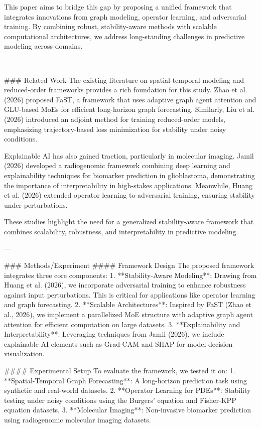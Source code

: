 This paper aims to bridge this gap by proposing a unified framework that integrates innovations from graph modeling, operator learning, and adversarial training. By combining robust, stability-aware methods with scalable computational architectures, we address long-standing challenges in predictive modeling across domains.

---

### Related Work
The existing literature on spatial-temporal modeling and reduced-order frameworks provides a rich foundation for this study. Zhao et al. (2026) proposed FaST, a framework that uses adaptive graph agent attention and GLU-based MoEs for efficient long-horizon graph forecasting. Similarly, Liu et al. (2026) introduced an adjoint method for training reduced-order models, emphasizing trajectory-based loss minimization for stability under noisy conditions.

Explainable AI has also gained traction, particularly in molecular imaging. Jamil (2026) developed a radiogenomic framework combining deep learning and explainability techniques for biomarker prediction in glioblastoma, demonstrating the importance of interpretability in high-stakes applications. Meanwhile, Huang et al. (2026) extended operator learning to adversarial training, ensuring stability under perturbations.

These studies highlight the need for a generalized stability-aware framework that combines scalability, robustness, and interpretability in predictive modeling.

---

### Methods/Experiment
#### Framework Design
The proposed framework integrates three core components:
1. **Stability-Aware Modeling**: Drawing from Huang et al. (2026), we incorporate adversarial training to enhance robustness against input perturbations. This is critical for applications like operator learning and graph forecasting.
2. **Scalable Architectures**: Inspired by FaST (Zhao et al., 2026), we implement a parallelized MoE structure with adaptive graph agent attention for efficient computation on large datasets.
3. **Explainability and Interpretability**: Leveraging techniques from Jamil (2026), we include explainable AI elements such as Grad-CAM and SHAP for model decision visualization.

#### Experimental Setup
To evaluate the framework, we tested it on:
1. **Spatial-Temporal Graph Forecasting**: A long-horizon prediction task using synthetic and real-world datasets.
2. **Operator Learning for PDEs**: Stability testing under noisy conditions using the Burgers' equation and Fisher-KPP equation datasets.
3. **Molecular Imaging**: Non-invasive biomarker prediction using radiogenomic molecular imaging datasets.


